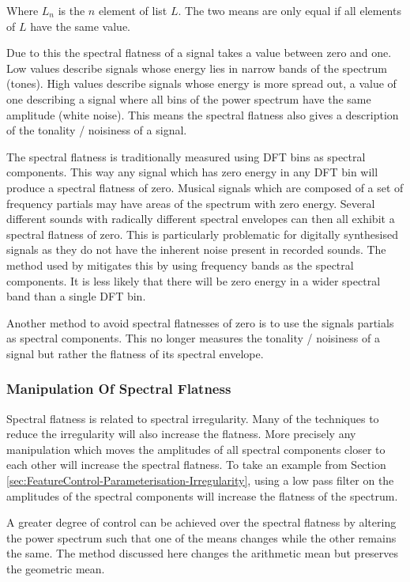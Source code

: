 		Where $L_{n}$ is the $n$ element of list $L$. The two means are only equal if all elements of $L$
		have the same value.

		Due to this the spectral flatness of a signal takes a value between zero and one. Low values describe
		signals whose energy lies in narrow bands of the spectrum (tones). High values describe signals whose
		energy is more spread out, a value of one describing a signal where all bins of the power spectrum have the
		same amplitude (white noise). This means the spectral flatness also gives a description of the tonality /
		noisiness of a signal.

		The spectral flatness is traditionally measured using DFT bins as spectral components. This way any signal
		which has zero energy in any DFT bin will produce a spectral flatness of zero. Musical signals which are
		composed of a set of frequency partials may have areas of the spectrum with zero energy. Several different
		sounds with radically different spectral envelopes can then all exhibit a spectral flatness of zero. This
		is particularly problematic for digitally synthesised signals as they do not have the inherent noise
		present in recorded sounds. The method used by \citet{peeters2004a} mitigates this by using frequency bands
		as the spectral components. It is less likely that there will be zero energy in a wider spectral band than
		a single DFT bin. 
		
		Another method to avoid spectral flatnesses of zero is to use the signals partials as spectral components.
		This no longer measures the tonality / noisiness of a signal but rather the flatness of its spectral
		envelope.

		\subsubsection*{Manipulation Of Spectral Flatness}
			Spectral flatness is related to spectral irregularity. Many of the techniques to reduce the
			irregularity will also increase the flatness. More precisely any manipulation which moves the
			amplitudes of all spectral components closer to each other will increase the spectral flatness. To
			take an example from Section \ref{sec:FeatureControl-Parameterisation-Irregularity}, using a low
			pass filter on the amplitudes of the spectral components will increase the flatness of the
			spectrum.

			A greater degree of control can be achieved over the spectral flatness by altering the power
			spectrum such that one of the means changes while the other remains the same. The method discussed
			here changes the arithmetic mean but preserves the geometric mean. 

